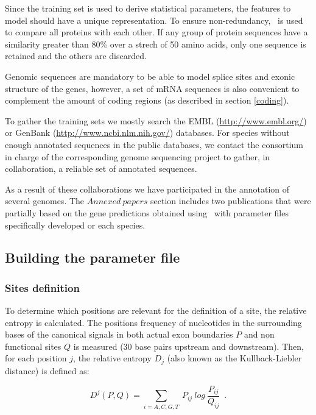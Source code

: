 Since the training set is used to derive statistical parameters, the
features to model should have a unique representation.  To ensure
non-redundancy, \blp\ is used to compare all proteins with each
other. If any group of protein sequences have a similarity greater
than 80\% over a strech of 50 amino acids, only one sequence is
retained and the others are discarded.

Genomic sequences are mandatory to be able to model splice sites and
exonic structure of the genes, however, a set of mRNA sequences is
also convenient to complement the amount of coding regions (as
described in section \ref{coding}).

To gather the training sets we mostly search the EMBL
(\url{http://www.embl.org/}) or GenBank
(\url{http://www.ncbi.nlm.nih.gov/}) databases. For species without
enough annotated sequences in the public databases, we contact the
consortium in charge of the corresponding genome sequencing project to
gather, in collaboration, a reliable set of annotated sequences.

As a result of these collaborations we have participated in the
annotation of several genomes. The $Annexed\ papers$ section includes
two publications that were partially based on the gene predictions
obtained using \geneid\ with parameter files specifically developed
or each species.

\subsection{Building the parameter file}
\label{training protocol}

\subsubsection{Sites definition}

To determine which positions are relevant for the definition of a
site, the relative entropy is calculated. The positions frequency of
nucleotides in the surrounding bases of the canonical signals in both
actual exon boundaries $P$ and non functional sites $Q$ is measured
(30 base pairs upstream and downstream). Then, for each position $j$,
the relative entropy $D_j$ (also known as the Kullback-Liebler
distance) is defined as:

\begin{equation}
D^j (P,Q) =\sum_{i=A,C,G,T}\ P_{ij}\ log\ \frac{P_{ij}}{Q_{ij}}\,\,\,.
\end{equation}

